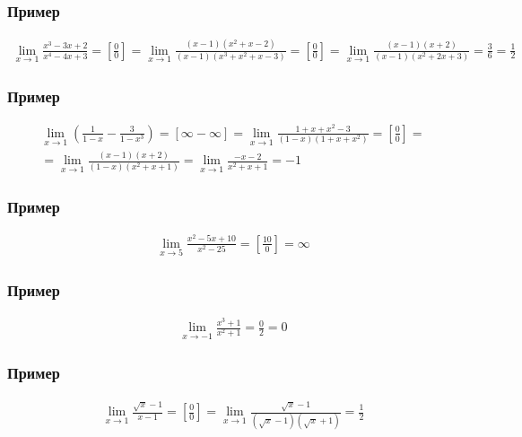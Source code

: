 \documentclass{article}
\begin{document}
\subsubsection{Пример}
\begin{gather*}
    \lim_{x \to 1} \frac{x^3 - 3x + 2}{x^4 - 4x + 3} =
    \left[ \frac{0}{0} \right] =
    \lim_{x \to 1} \frac{(x - 1)(x^2 + x - 2)}{(x - 1)(x^3 + x^2 + x - 3)} =
    \left[ \frac{0}{0} \right] =
    \lim_{x \to 1} \frac{(x - 1)(x + 2)}{(x - 1)(x^2 + 2x + 3)} =
    \frac{3}{6} = \frac{1}{2}
\end{gather*}

\subsubsection{Пример}
\begin{gather*}
    \lim_{x \to 1} \left( \frac{1}{1 - x} - \frac{3}{1 - x^3} \right) = 
    [\infty - \infty] =
    \lim_{x \to 1} \frac{1 + x + x^2 - 3}{(1 - x)(1 + x + x^2)} =
    \left[ \frac{0}{0} \right] = \\
    = \lim_{x \to 1} \frac{(x - 1)(x + 2)}{(1 - x)(x^2 + x + 1)} =
    \lim_{x \to 1} \frac{-x - 2}{x^2 + x + 1} = -1
\end{gather*}

\subsubsection{Пример}
\begin{gather*}
    \lim_{x \to 5} \frac{x^2 - 5x + 10}{x^2 - 25} =
    \left[ \frac{10}{0} \right] = \infty
\end{gather*}

\subsubsection{Пример}
\begin{gather*}
    \lim_{x \to -1} \frac{x^3 + 1}{x^2 + 1} = \frac{0}{2} = 0
\end{gather*}

\subsubsection{Пример}
\begin{gather*}
    \lim_{x \to 1} \frac{\sqrt{x} - 1}{x - 1} = 
    \left[ \frac{0}{0} \right] =
    \lim_{x \to 1} \frac{\sqrt{x} - 1}{(\sqrt{x} - 1)(\sqrt{x} + 1)} = \frac{1}{2}
\end{gather*}
\end{document}
